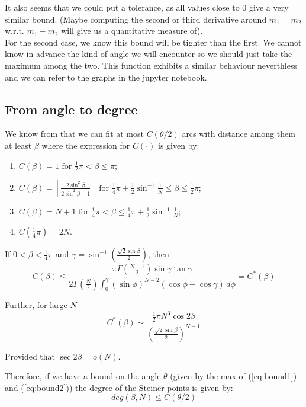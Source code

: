\documentclass{article}
\begin{document}
    It also seems that we could put a tolerance, as all values close to 0 give a very similar bound. (Maybe
    computing the second or third derivative around $m_1=m_2$ w.r.t. $m_1-m_2$ will give us a quantitative measure of).
    \\
    For the second case, we know this bound will be tighter than the first. We cannot know in advance the kind of angle we will encounter
    so we should just take the maximum among the two. This function exhibits a similar behaviour neverthless and we can refer to the
    graphs in the jupyter notebook.

    \subsection{From angle to degree}

    We know from \cite{coso sui cap sferici} that we can fit at most $C(\theta/2)$ arcs with distance among them at least $\beta$ where the expression for $C(\cdot)$
    is given by:
    \begin{enumerate}
        \item[(i)] \( C(\beta) = 1 \text{ for } \frac{1}{2}\pi < \beta \leq \pi; \)
        \item[(ii)] \( C(\beta) = \left\lfloor \frac{2 \sin^2 \beta}{2 \sin^2 \beta - 1} \right\rfloor \text{ for } \frac{1}{4}\pi + \frac{1}{2} \sin^{-1} \frac{1}{N} \leq \beta \leq \frac{1}{2}\pi; \)
        \item[(iii)] \( C(\beta) = N + 1 \text{ for } \frac{1}{4}\pi < \beta \leq \frac{1}{4}\pi + \frac{1}{2} \sin^{-1} \frac{1}{N}; \)
        \item[(iv)] \( C\left(\frac{1}{4}\pi\right) = 2N. \)
    \end{enumerate}

    If $0 < \beta < \frac{1}{4}\pi$ and $\gamma = \sin^{-1}\left(\frac{\sqrt{2} \sin \beta}{2}\right)$, then
    \begin{equation}
        C(\beta) \leq \frac{\pi \Gamma\left(\frac{N-1}{2}\right) \sin \gamma \tan \gamma}{2 \Gamma\left(\frac{N}{2}\right) \int_0^{\gamma} (\sin \phi)^{N-2} (\cos \phi - \cos \gamma) \, d\phi} = C^*(\beta)
    \end{equation}

    Further, for large $N$
    \begin{equation}
        C^*(\beta) \sim \frac{\frac{1}{2}\pi N^3 \cos 2\beta}{(\frac{\sqrt{2} \sin \beta}{2})^{N-1}}
    \end{equation}

    Provided that $\sec 2\beta = o(N)$.


    Therefore, if we have a bound on the angle $\theta$ (given by the max of (\ref{eq:bound1}) and (\ref{eq:bound2})) the degree of the Steiner points is given by:
    \begin{equation}
        deg(\beta, N) \leq C(\theta/2)
    \end{equation}
\end{document}
